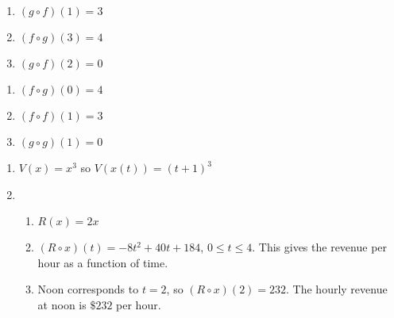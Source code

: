 \pagebreak

\begin{multicols}{3}
\begin{enumerate}
\setcounter{enumi}{\value{HW}}

\item  $(g\circ f)(1) = 3$ 
\item  $(f \circ g)(3) = 4$
\item  $(g\circ f)(2) = 0$
\setcounter{HW}{\value{enumi}}
\end{enumerate}
\end{multicols}

\begin{multicols}{3}
\begin{enumerate}
\setcounter{enumi}{\value{HW}}
\item  $(f\circ g)(0) = 4$  
\item  $(f\circ f)(1) = 3$
\item  $(g \circ g)(1) = 0$

\setcounter{HW}{\value{enumi}}
\end{enumerate}
\end{multicols}

\begin{enumerate}
\setcounter{enumi}{\value{HW}}

\item $V(x) = x^{3}$ so $V(x(t)) = (t + 1)^{3}$

\item  \begin{enumerate}

\item  $R(x) = 2x$

\item  $\left(R \circ x \right)(t) =  -8t^2+40t+184$, $0 \leq t \leq 4$.  This gives the revenue per hour as a function of time.

\item  Noon corresponds to $t=2$, so $\left(R \circ x \right)(2) = 232$.  The hourly revenue at noon is $\$232$ per hour. 

\end{enumerate}

\end{enumerate}

\closegraphsfile

